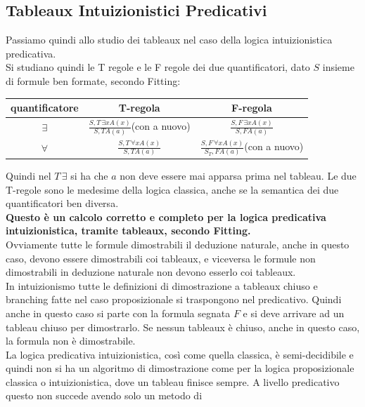 \documentclass[a4paper,12pt, oneside]{book}
\begin{document}
\subsection{Tableaux Intuizionistici Predicativi}
Passiamo quindi allo studio dei tableaux nel caso della logica intuizionistica
predicativa. \\
Si studiano quindi le T regole e le F regole dei due quantificatori, dato $S$
insieme di formule ben formate, secondo Fitting:
\begin{table}[H]
  \centering
  \Large
  \begin{tabular}{c||c|c}
    quantificatore & T-regola & F-regola\\
    \hline
    $\exists$ & $\frac{S,T\,\exists x A(x)}{S,TA(a)}${\small{(con a nuovo)}}
                              & $\frac{S,F\,\exists x A(x)}{S,FA(a)}$\\
    \hline
    $\forall$ & $\frac{S,T\,\forall x A(x)}{S,TA(a)}$
                              & $\frac{S,F\,\forall x A(x)}{S_T,
                                FA(a)}${\small{(con a nuovo)}}\\
    \hline
  \end{tabular}
\end{table}
Quindi nel $T\,\exists$ si ha che $a$ non deve essere mai apparsa prima nel
tableau. Le due T-regole sono le medesime della logica classica, anche se la
semantica dei due quantificatori ben diversa.\\
\textbf{Questo è un calcolo corretto e completo per la logica predicativa
  intuizionistica, tramite tableaux, secondo Fitting.}\\
Ovviamente tutte le formule dimostrabili il deduzione naturale, anche in questo
caso, devono essere dimostrabili coi tableaux, e viceversa le formule non
dimostrabili in deduzione naturale non devono esserlo coi tableaux.\\
In intuizionismo tutte le definizioni di dimostrazione a tableaux chiuso e
branching fatte nel caso proposizionale si traspongono nel predicativo. Quindi
anche in questo caso si parte con la formula segnata $F$ e si deve arrivare ad
un tableau chiuso per dimostrarlo. Se nessun tableaux è chiuso, anche in questo
caso, la formula non è dimostrabile.\\
La logica predicativa intuizionistica, così come quella classica, è
semi-decidibile e quindi non si ha un algoritmo di dimostrazione come per la
logica proposizionale classica o intuizionistica, dove un tableau finisce
sempre. A livello predicativo questo non succede avendo solo un metodo di
\end{document}
